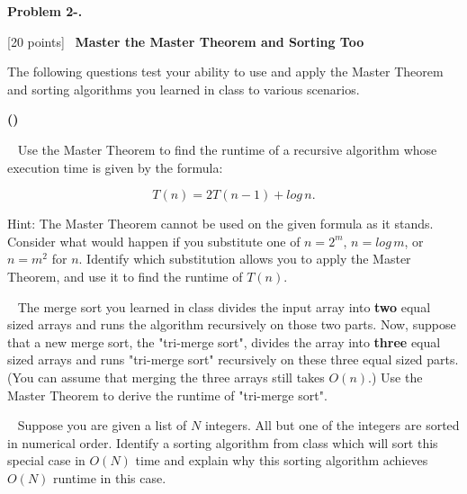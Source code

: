 \documentclass[12pt,twoside]{article}
\makeatletter
\newcommand{\points}[1]{[#1 points]\ }
\def\MLine#1{\par\hspace*{-\leftmargin}\parbox{\textwidth}{\[#1\]}}
\newcounter{problemnum}
\newcommand{\theproblem}{Problem \theproblemsetnum-\arabic{problemnum}}
\newenvironment{problems}{
        \begin{list}{{\bf \theproblem. \hspace*{0.5em}}}
        {\setlength{\leftmargin}{0em}
         \setlength{\rightmargin}{0em}
         \setlength{\labelwidth}{0em}
         \setlength{\labelsep}{0em}
         \usecounter{problemnum}}}{\end{list}}
\newcommand{\problem}[1][{}]{\item \let\@currentlabel=\theproblem \textbf{#1}}
\newcounter{problempartnum}[problemnum]
\newenvironment{problemparts}{
        \begin{list}{{\bf (\alph{problempartnum})}}
        {\setlength{\leftmargin}{2.5em}
         \setlength{\rightmargin}{2.5em}
         \setlength{\labelsep}{0.5em}}}{\end{list}}
\newcommand{\problempart}{\addtocounter{problempartnum}{1}\item}
\newcommand{\theproblemsetnum}{2}
\makeatother
\begin{document}
\begin{problems}
\problem \points{20} \textbf{Master the Master Theorem and Sorting Too}

The following questions test your ability to use and apply the Master Theorem and sorting algorithms you learned in class to various scenarios.

\begin{problemparts}
\problempart \points{10} Use the Master Theorem to find the runtime of a recursive algorithm whose execution time is given by the formula:

\MLine{T(n) = 2T(n-1) + log\,n.}

Hint: The Master Theorem cannot be used on the given formula as it stands. Consider what would happen if you substitute one of $n = 2^m$, $n = log\,m$, or $n=m^2$ for $n$. Identify which substitution allows you to apply the Master Theorem, and use it to find the runtime of $T(n)$.


\problempart \points{5}
The merge sort you learned in class divides the input array into \textbf{two} equal sized arrays and runs the algorithm recursively on those two parts. Now, suppose that a new merge sort, the "tri-merge sort", divides the array into \textbf{three} equal sized arrays and runs "tri-merge sort" recursively on these three equal sized parts. (You can assume that merging the three arrays still takes $O(n)$.) Use the Master Theorem to derive the runtime of "tri-merge sort".


\problempart \points{5}
Suppose you are given a list of $N$ integers. All but one of the integers are sorted in numerical order. Identify a sorting algorithm from class which will sort this special case in $O(N)$ time and  explain why this sorting algorithm achieves $O(N)$ runtime in this case.



\end{problemparts}
\end{problems}
\end{document}
